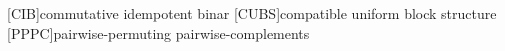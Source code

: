 \usepackage{xspace}
\usepackage[smaller]{acronym}%

[CIB]{commutative idempotent binar}
[CUBS]{compatible uniform block structure}
\newcommand{\cubs}{\acs{cubs}\xspace}
[PPPC]{pairwise-permuting pairwise-complements}
\newcommand{\pppc}{\acs{pppc}\xspace}
\newcommand\dotsize{1pt}
\newcommand{\q}[2]{\ensuremath{#1 < #2}}
\newcommand{\qab}{\ensuremath{\q{\alpha}{\beta}}}
\newcommand{\resB}{\ensuremath{|_B}}
\newcommand{\resBi}{\ensuremath{|_{B_i}}}
\newcommand{\resU}{\ensuremath{|_U}}
\newcommand{\resV}{\ensuremath{|_V}}
\newcommand{\res}[1]{\ensuremath{|_{#1}}}
\newcommand{\suchthat}{\ensuremath{\mid}}  %

   \newcommand{\todo}[1]{\ifthenelse{\boolean{todos}}{%
       ~\vskip0.1mm\noindent {\bf To do:} #1\vskip2mm}{}}

